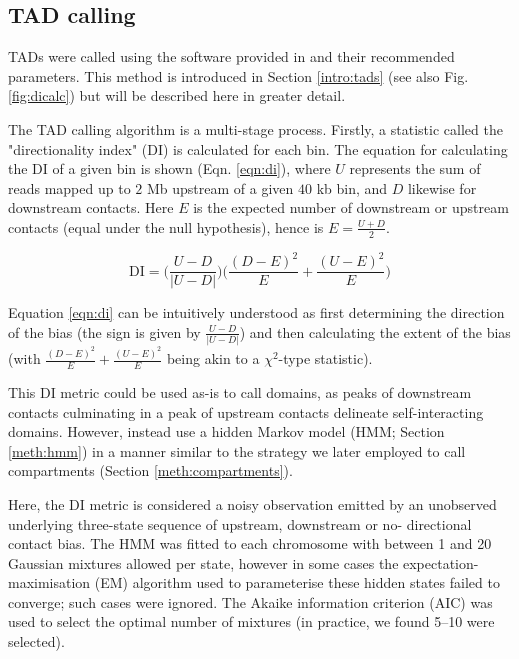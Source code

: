 \documentclass[a4paper,11pt,oneside]{book}
\begin{document}
\subsection{TAD calling}\label{meth:tadcalling}

TADs were called using the software provided in
\citet{Dixon2012} and their recommended parameters. This method is introduced in Section \ref{intro:tads} (see also Fig. \ref{fig:dicalc}) but will be described here in greater detail.

The TAD calling algorithm is a multi-stage process. Firstly, a statistic called the "directionality index" (DI) is calculated for each bin.\cite{Dixon2012} The equation for calculating the DI of a given bin is shown (Eqn. \ref{eqn:di}), where $U$ represents the sum of reads mapped up to $2$ Mb upstream of a given $40$ kb bin, and $D$ likewise for downstream contacts. Here $E$ is the expected number of downstream or upstream contacts (equal under the null hypothesis), hence is $E = \frac{U + D}{2}$. 

\begin{equation}\label{eqn:di}
\mathrm{DI} = \bigg(\frac{U - D}{|U - D|}\bigg)\bigg(\frac{(D - E)^2}{E} + \frac{(U - E)^2}{E}\bigg)
\end{equation}\vspace{.2em}

Equation \ref{eqn:di} can be intuitively understood as first determining the direction of the bias (the sign is given by $\frac{U - D}{|U - D|}$) and then calculating the extent of the bias (with $\frac{(D - E)^2}{E} + \frac{(U - E)^2}{E}$ being akin to a $\chi^2$-type statistic).\cite{Dixon2012}

This DI metric could be used as-is to call domains, as peaks of downstream contacts culminating in a peak of upstream contacts delineate self-interacting domains. However, \citet{Dixon2012} instead use a hidden Markov model (HMM; Section \ref{meth:hmm}) in a manner similar to the strategy we later employed to call compartments (Section \ref{meth:compartments}). 

Here, the DI metric is considered a noisy observation emitted by an unobserved underlying three-state sequence of upstream, downstream or no- directional contact bias.\cite{Dixon2012} The HMM was fitted to each chromosome with between 1 and 20 Gaussian mixtures allowed per state, however in some cases the expectation-maximisation (EM) algorithm used to parameterise these hidden states failed to converge; such cases were ignored. The Akaike information criterion (AIC) was used to select the optimal number of mixtures (in practice, we found 5--10 were selected). 
\end{document}
